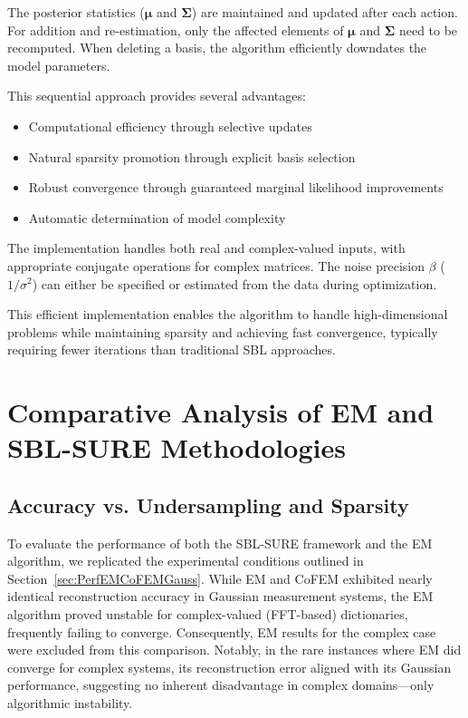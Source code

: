 \documentclass{article}
\begin{document}
The posterior statistics ($\boldsymbol{\mu}$ and $\boldsymbol{\Sigma}$) are maintained and updated after each action. For addition and re-estimation, only the affected elements of $\boldsymbol{\mu}$ and $\boldsymbol{\Sigma}$ need to be recomputed. When deleting a basis, the algorithm efficiently downdates the model parameters.

This sequential approach provides several advantages:
\begin{itemize}
\item Computational efficiency through selective updates
\item Natural sparsity promotion through explicit basis selection
\item Robust convergence through guaranteed marginal likelihood improvements
\item Automatic determination of model complexity
\end{itemize}

The implementation handles both real and complex-valued inputs, with appropriate conjugate operations for complex matrices. The noise precision $\beta$ ($1/\sigma^2$) can either be specified or estimated from the data during optimization.

This efficient implementation enables the algorithm to handle high-dimensional problems while maintaining sparsity and achieving fast convergence, typically requiring fewer iterations than traditional SBL approaches.

\section{Comparative Analysis of EM and SBL-SURE Methodologies}
\subsection{Accuracy vs. Undersampling and Sparsity}
To evaluate the performance of both the SBL-SURE framework and the EM algorithm, we replicated the experimental conditions outlined in Section~\ref{sec:PerfEMCoFEMGauss}. While EM and CoFEM exhibited nearly identical reconstruction accuracy in Gaussian measurement systems, the EM algorithm proved unstable for complex-valued (FFT-based) dictionaries, frequently failing to converge. Consequently, EM results for the complex case were excluded from this comparison. Notably, in the rare instances where EM did converge for complex systems, its reconstruction error aligned with its Gaussian performance, suggesting no inherent disadvantage in complex domains—only algorithmic instability.
\end{document}
